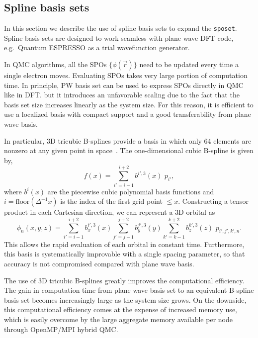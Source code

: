 \subsection{Spline basis sets}
In this section we describe the use of spline basis sets to expand the \texttt{sposet}.
Spline basis sets are designed to work seamless with plane wave DFT code, e.g.\ Quantum ESPRESSO as a trial wavefunction generator.

In QMC algorithms, all the SPOs $\{\phi(\vec{r})\}$ need to be updated every time a single electron moves.
Evaluating SPOs takes very large portion of computation time.
In principle, PW basis set can be used to express SPOs directly in QMC like in DFT.
but it introduces an unfavorable scaling due to the fact 
that the basis set size increases linearly as the system size.
For this reason, it is efficient to use a localized basis with compact
support and a good transferability from plane wave basis. 

In particular, 3D tricubic B-splines provide a basis in which only
64 elements are nonzero at any given point in space~\cite{blips4QMC}.
The one-dimensional cubic B-spline is given by,
\begin{equation}
f(x) = \sum_{i'=i-1}^{i+2} b^{i'\!,3}(x)\,\,  p_{i'},
\label{eq:SplineFunc}
\end{equation}
where $b^{i}(x)$ are the piecewise cubic polynomial basis functions
and $i = \text{floor}(\Delta^{-1} x)$ is the index of
the first grid point $\le x$.  Constructing a tensor product in each Cartesian
direction, we can represent a 3D orbital as
\begin{equation}
  \phi_n(x,y,z) = 
  \!\!\!\!\sum_{i'=i-1}^{i+2} \!\! b_x^{i'\!,3}(x) 
  \!\!\!\!\sum_{j'=j-1}^{j+2} \!\! b_y^{j'\!,3}(y) 
  \!\!\!\!\sum_{k'=k-1}^{k+2} \!\! b_z^{k'\!,3}(z) \,\, p_{i', j', k',n}.
\label{eq:TricubicValue}
\end{equation}
This allows the rapid evaluation of each orbital in constant time.
Furthermore, this basis is systematically improvable with a single spacing
parameter, so that accuracy is not compromised compared with plane wave basis.

The use of 3D tricubic B-splines greatly improves the computational efficiency.
The gain in computation time from plane wave basis set to an equivalent B-spline basis set 
becomes increasingly large as the system size grows.
On the downside, this computational efficiency comes at
the expense of increased memory use, which is easily overcome by the large
aggregate memory available per node through OpenMP/MPI hybrid QMC.

